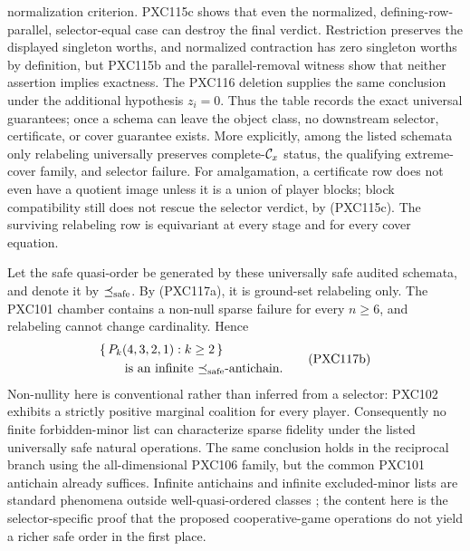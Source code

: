 \documentclass[11pt]{article}
\begin{document}
normalization criterion.  PXC115c shows that even the normalized,
defining-row-parallel, selector-equal case can destroy the final verdict.
Restriction preserves the displayed singleton worths, and normalized
contraction has zero singleton worths by definition, but PXC115b and the
parallel-removal witness show that neither assertion implies exactness.
The PXC116 deletion supplies the same conclusion under the additional
hypothesis \(z_i=0\).  Thus the table records the exact universal guarantees;
once a schema can leave the object class, no downstream selector,
certificate, or cover guarantee exists.  More explicitly, among the listed
schemata only relabeling universally preserves complete-\({\cal C}_x\)
status, the qualifying extreme-cover family, and selector failure.  For
amalgamation, a certificate row does not even have a quotient image unless
it is a union of player blocks; block compatibility still does not rescue
the selector verdict, by (PXC115c).  The surviving relabeling row is
equivariant at every stage and for every cover equation.

Let the safe quasi-order be generated by these universally safe audited
schemata, and denote it by \(\preceq_{\rm safe}\).  By (PXC117a), it is
ground-set relabeling only.  The PXC101 chamber contains a non-null sparse
failure for every \(n\ge6\), and relabeling cannot change cardinality.  Hence
\begin{equation}
\begin{split}
 &\{\,P_k(4,3,2,1): k\ge2\,\}\\
 &\hspace{2em}\text{is an infinite \(\preceq_{\rm safe}\)-antichain}.
\end{split}                                                  \tag{PXC117b}
\end{equation}
Non-nullity here is conventional rather than inferred from a selector:
PXC102 exhibits a strictly positive marginal coalition for every player.
Consequently no finite forbidden-minor list can characterize sparse fidelity
under the listed universally safe natural operations.  The same conclusion
holds in the reciprocal branch using the all-dimensional PXC106 family, but
the common PXC101 antichain already suffices.  Infinite antichains and
infinite excluded-minor lists are standard phenomena outside
well-quasi-ordered classes \citep{Whittle2005}; the content here is the
selector-specific proof that the proposed cooperative-game operations do not
yield a richer safe order in the first place.
\end{document}
